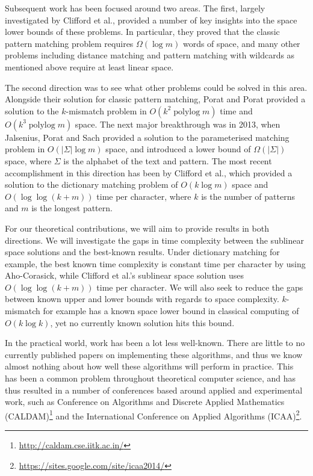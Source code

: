 \documentclass[a4paper,11pt]{article}
\DeclareMathOperator\polylog{polylog}
\begin{document}
    Subsequent work has been focused around two areas. The first, largely investigated by Clifford et al.\@ \cite{DBLP:journals/corr/abs-1106-4412}, provided a number of key insights into the space lower bounds of these problems. In particular, they proved that the classic pattern matching problem requires $\Omega(\log m)$ words of space, and many other problems including distance matching and pattern matching with wildcards as mentioned above require at least linear space.

    The second direction was to see what other problems could be solved in this area. Alongside their solution for classic pattern matching, Porat and Porat \cite{5438620} provided a solution to the $k$-mismatch problem in $O(k^2\polylog m)$ time and $O(k^3\polylog m)$ space. The next major breakthrough was in 2013, when Jalsenius, Porat and Sach \cite{JPS:2013} provided a solution to the parameterised matching problem in $O(|\Sigma|\log m)$ space, and introduced a lower bound of $\Omega(|\Sigma|)$ space, where $\Sigma$ is the alphabet of the text and pattern. The most recent accomplishment in this direction has been by Clifford et al.\@ \cite{2015arXiv150406242C}, which provided a solution to the dictionary matching problem of $O(k\log m)$ space and $O(\log\log(k + m))$ time per character, where $k$ is the number of patterns and $m$ is the longest pattern.

    For our theoretical contributions, we will aim to provide results in both directions. We will investigate the gaps in time complexity between the sublinear space solutions and the best-known results. Under dictionary matching for example, the best known time complexity is constant time per character by using Aho-Corasick, while Clifford et al.'s sublinear space solution uses $O(\log\log(k + m))$ time per character. We will also seek to reduce the gaps between known upper and lower bounds with regards to space complexity. $k$-mismatch for example has a known space lower bound in classical computing of $O(k\log k)$, yet no currently known solution hits this bound.

    In the practical world, work has been a lot less well-known. There are little to no currently published papers on implementing these algorithms, and thus we know almost nothing about how well these algorithms will perform in practice. This has been a common problem throughout theoretical computer science, and has thus resulted in a number of conferences based around applied and experimental work, such as Conference on Algorithms and Discrete Applied Mathematics (CALDAM)\footnote{\url{http://caldam.cse.iitk.ac.in/}} and the International Conference on Applied Algorithms (ICAA)\footnote{\url{https://sites.google.com/site/icaa2014/}}.
\end{document}
